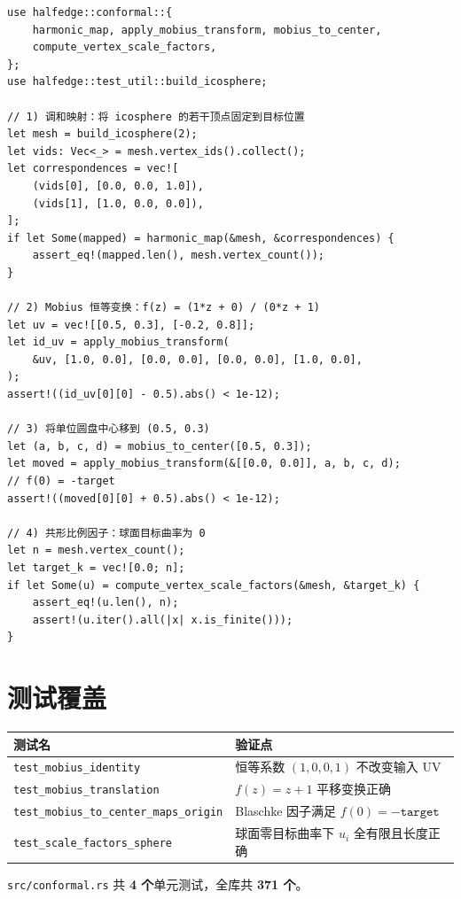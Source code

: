 \documentclass[11pt,a4paper]{article}
\begin{document}
\begin{lstlisting}
use halfedge::conformal::{
    harmonic_map, apply_mobius_transform, mobius_to_center,
    compute_vertex_scale_factors,
};
use halfedge::test_util::build_icosphere;

// 1) 调和映射：将 icosphere 的若干顶点固定到目标位置
let mesh = build_icosphere(2);
let vids: Vec<_> = mesh.vertex_ids().collect();
let correspondences = vec![
    (vids[0], [0.0, 0.0, 1.0]),
    (vids[1], [1.0, 0.0, 0.0]),
];
if let Some(mapped) = harmonic_map(&mesh, &correspondences) {
    assert_eq!(mapped.len(), mesh.vertex_count());
}

// 2) Mobius 恒等变换：f(z) = (1*z + 0) / (0*z + 1)
let uv = vec![[0.5, 0.3], [-0.2, 0.8]];
let id_uv = apply_mobius_transform(
    &uv, [1.0, 0.0], [0.0, 0.0], [0.0, 0.0], [1.0, 0.0],
);
assert!((id_uv[0][0] - 0.5).abs() < 1e-12);

// 3) 将单位圆盘中心移到 (0.5, 0.3)
let (a, b, c, d) = mobius_to_center([0.5, 0.3]);
let moved = apply_mobius_transform(&[[0.0, 0.0]], a, b, c, d);
// f(0) = -target
assert!((moved[0][0] + 0.5).abs() < 1e-12);

// 4) 共形比例因子：球面目标曲率为 0
let n = mesh.vertex_count();
let target_k = vec![0.0; n];
if let Some(u) = compute_vertex_scale_factors(&mesh, &target_k) {
    assert_eq!(u.len(), n);
    assert!(u.iter().all(|x| x.is_finite()));
}
\end{lstlisting}

\section{测试覆盖}

\begin{center}
\renewcommand{\arraystretch}{1.18}
\begin{tabular}{@{}ll@{}}
  \toprule
  \textbf{测试名} & \textbf{验证点} \\
  \midrule
  \texttt{test\_mobius\_identity}             & 恒等系数 $(1,0,0,1)$ 不改变输入 UV \\
  \texttt{test\_mobius\_translation}          & $f(z)=z+1$ 平移变换正确 \\
  \texttt{test\_mobius\_to\_center\_maps\_origin} & Blaschke 因子满足 $f(0)=-\texttt{target}$ \\
  \texttt{test\_scale\_factors\_sphere}       & 球面零目标曲率下 $u_i$ 全有限且长度正确 \\
  \bottomrule
\end{tabular}
\end{center}

\texttt{src/conformal.rs} 共 \textbf{4 个}单元测试，全库共 \textbf{371 个}。
\end{document}
